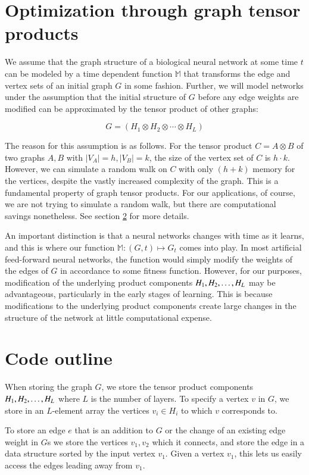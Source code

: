 \documentclass{article}
\newcommand{\tensProd}{\otimes}
\newcommand{\M}{\mathbb{M}}
\begin{document}
\section{Optimization through graph tensor products}

We assume that the graph structure of a biological neural network at some time $t$ can be modeled by a time dependent function $\M$ that transforms the edge and vertex sets of an initial graph $G$ in some fashion. Further, we will model networks under the assumption that the initial structure of $G$ before any edge weights are modified can be approximated by the tensor product of other graphs:

$$ G = (H_1 \tensProd H_2 \tensProd \cdots \tensProd H_L ) $$

The reason for this assumption is as follows. For the tensor product $ C = A \otimes B$ of two graphs $A,B$ with $|V_A| = h, |V_B| = k$, the size of the vertex set of $C$ is $h \cdot k$. However, we can simulate a random walk on $C$ with only $(h + k)$ memory for the vertices, despite the vastly increased complexity of the graph. This is a fundamental property of graph tensor products. For our applications, of course, we are not trying to simulate a random walk, but there are computational savings nonetheless. See section \ref{code_outline} for more details.

An important distinction is that a neural networks changes with time as it learns, and this is where our function $\M : (G, t) \mapsto G_t$ comes into play. In most artificial feed-forward neural networks, the function would simply modify the weights of the edges of $G$ in accordance to some fitness function. However, for our purposes, modification of the underlying product components $H_1, H_2, \ldots, H_{L}$ may be advantageous, particularly in the early stages of learning. This is because modifications to the underlying product components create large changes in the structure of the network at little computational expense.

\section{Code outline} \label{code_outline}

When storing the graph $G$, we store the tensor product components $H_1, H_2, \ldots, H_{L}$ where $L$ is the number of layers. To specify a vertex $v$ in $G$, we store in an $L$-element array the vertices $v_i \in H_i$ to which $v$ corresponds to.

To store an edge $e$ that is an addition to $G$ or the change of an existing edge weight in $G$s we store the vertices $v_1, v_2$ which it connects, and store the edge in a data structure sorted by the input vertex $v_1$. Given a vertex $v_1$, this lets us easily access the edges leading away from $v_1$.
\end{document}
